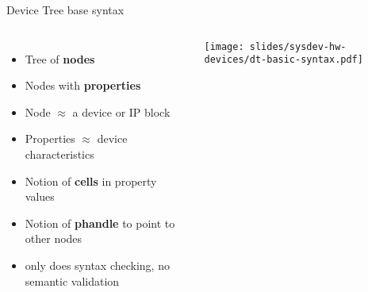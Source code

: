 \begin{frame}{Device Tree base syntax}
  \begin{columns}
    \begin{itemize}
    \item Tree of {\bf nodes}
    \item Nodes with {\bf properties}
    \item Node $\approx$ a device or IP block
    \item Properties $\approx$ device characteristics
    \item Notion of {\bf cells} in property values
    \item Notion of {\bf phandle} to point to other nodes
    \item {} only does syntax checking, no semantic validation
    \end{itemize}
    \begin{center}
      \texttt{[image: slides/sysdev-hw-devices/dt-basic-syntax.pdf]}
    \end{center}
  \end{columns}
\end{frame}

